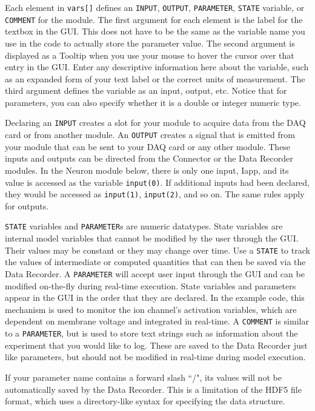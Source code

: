 Each element in \texttt{vars[]} defines an \texttt{INPUT}, \texttt{OUTPUT}, \texttt{PARAMETER}, \texttt{STATE} variable, or \texttt{COMMENT} for the module.  The first argument for each element is the label for the textbox in the GUI. This does not have to be the same as the variable name you use in the code to actually store the parameter value. The second argument is displayed as a Tooltip when you use your mouse to hover the cursor over that entry in the GUI. Enter any descriptive information here about the variable, such as an expanded form of your text label or the correct units of measurement. The third argument defines the variable as an input, output, etc. Notice that for parameters, you can also specify whether it is a double or integer numeric type. 

Declaring an \texttt{INPUT} creates a slot for your module to acquire data from the DAQ card or from another module. An \texttt{OUTPUT} creates a signal that is emitted from your module that can be sent to your DAQ card or any other module. These inputs and outputs can be directed from the Connector or the Data Recorder modules. In the Neuron module below, there is only one input, Iapp, and its value is accessed as the variable \texttt{input(0)}. If additional inputs had been declared, they would be accessed as \texttt{input(1)}, \texttt{input(2)}, and so on. The same rules apply for outputs. 

\texttt{STATE} variables and \texttt{PARAMETER}s are numeric datatypes. State variables are internal model variables that cannot be modified by the user through the GUI. Their values may be constant or they may change over time. Use a \texttt{STATE} to track the values of intermediate or computed quantities that can then be saved via the Data Recorder. A \texttt{PARAMETER} will accept user input through the GUI and can be modified on-the-fly during real-time execution. State variables and parameters appear in the GUI in the order that they are declared. In the example code, this mechanism is used to monitor the ion channel's activation variables, which are dependent on membrane voltage and integrated in real-time. A \texttt{COMMENT} is similar to a \texttt{PARAMETER}, but is used to store text strings such as information about the experiment that you would like to log. These are saved to the Data Recorder just like parameters, but should not be modified in real-time during model execution.

\attention If your parameter name contains a forward slash ``/", its values will not be automatically saved by the Data Recorder. This is a limitation of the HDF5 file format, which uses a directory-like syntax for specifying the data structure.

